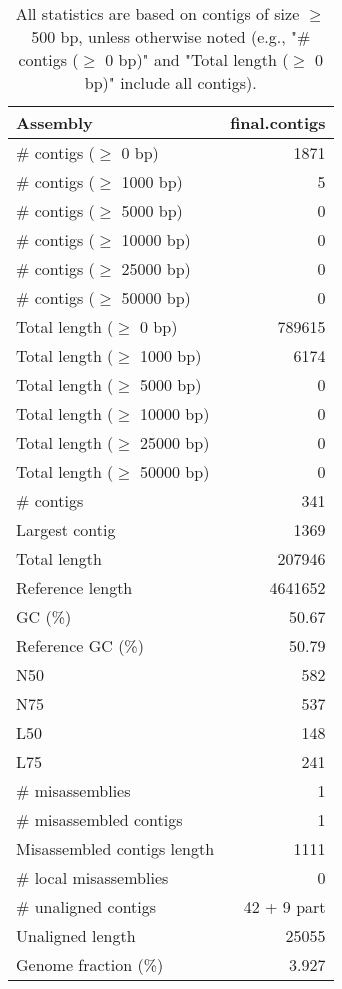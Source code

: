 \documentclass[12pt,a4paper]{article}
\begin{document}
\begin{table}[ht]
\begin{center}
\caption{All statistics are based on contigs of size $\geq$ 500 bp, unless otherwise noted (e.g., "\# contigs ($\geq$ 0 bp)" and "Total length ($\geq$ 0 bp)" include all contigs).}
\begin{tabular}{|l*{1}{|r}|}
\hline
Assembly & final.contigs \\ \hline
\# contigs ($\geq$ 0 bp) & 1871 \\ \hline
\# contigs ($\geq$ 1000 bp) & 5 \\ \hline
\# contigs ($\geq$ 5000 bp) & 0 \\ \hline
\# contigs ($\geq$ 10000 bp) & 0 \\ \hline
\# contigs ($\geq$ 25000 bp) & 0 \\ \hline
\# contigs ($\geq$ 50000 bp) & 0 \\ \hline
Total length ($\geq$ 0 bp) & 789615 \\ \hline
Total length ($\geq$ 1000 bp) & 6174 \\ \hline
Total length ($\geq$ 5000 bp) & 0 \\ \hline
Total length ($\geq$ 10000 bp) & 0 \\ \hline
Total length ($\geq$ 25000 bp) & 0 \\ \hline
Total length ($\geq$ 50000 bp) & 0 \\ \hline
\# contigs & 341 \\ \hline
Largest contig & 1369 \\ \hline
Total length & 207946 \\ \hline
Reference length & 4641652 \\ \hline
GC (\%) & 50.67 \\ \hline
Reference GC (\%) & 50.79 \\ \hline
N50 & 582 \\ \hline
N75 & 537 \\ \hline
L50 & 148 \\ \hline
L75 & 241 \\ \hline
\# misassemblies & 1 \\ \hline
\# misassembled contigs & 1 \\ \hline
Misassembled contigs length & 1111 \\ \hline
\# local misassemblies & 0 \\ \hline
\# unaligned contigs & 42 + 9 part \\ \hline
Unaligned length & 25055 \\ \hline
Genome fraction (\%) & 3.927 \\ \hline

\end{tabular}
\end{center}
\end{table}
\end{document}
